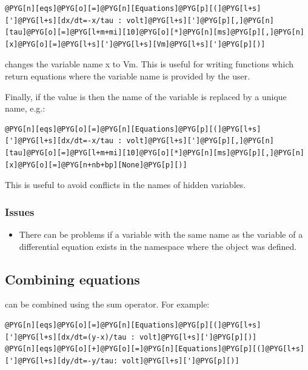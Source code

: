 \documentclass[letterpaper,10pt,english]{manual}
\begin{document}
\begin{Verbatim}[commandchars=@\[\]]
@PYG[n][eqs]@PYG[o][=]@PYG[n][Equations]@PYG[p][(]@PYG[l+s][']@PYG[l+s][dx/dt=-x/tau : volt]@PYG[l+s][']@PYG[p][,]@PYG[n][tau]@PYG[o][=]@PYG[l+m+mi][10]@PYG[o][*]@PYG[n][ms]@PYG[p][,]@PYG[n][x]@PYG[o][=]@PYG[l+s][']@PYG[l+s][Vm]@PYG[l+s][']@PYG[p][)]
\end{Verbatim}

changes the variable name x to Vm. This is useful for writing functions which return
equations where the variable name is provided by the user.

Finally, if the value is  then the name of the variable is replaced by a unique
name, e.g.:

\begin{Verbatim}[commandchars=@\[\]]
@PYG[n][eqs]@PYG[o][=]@PYG[n][Equations]@PYG[p][(]@PYG[l+s][']@PYG[l+s][dx/dt=-x/tau : volt]@PYG[l+s][']@PYG[p][,]@PYG[n][tau]@PYG[o][=]@PYG[l+m+mi][10]@PYG[o][*]@PYG[n][ms]@PYG[p][,]@PYG[n][x]@PYG[o][=]@PYG[n+nb+bp][None]@PYG[p][)]
\end{Verbatim}

This is useful to avoid conflicts in the names of hidden variables.


\subsubsection{Issues}
\begin{itemize}
\item {} 
There can be problems if a variable with the same name as the variable of a
differential equation exists in the namespace where the \hyperlink{brian.Equations}{} object was defined.

\end{itemize}

\subsection{Combining equations}

\hyperlink{brian.Equations}{} can be combined using the sum operator. For example:

\begin{Verbatim}[commandchars=@\[\]]
@PYG[n][eqs]@PYG[o][=]@PYG[n][Equations]@PYG[p][(]@PYG[l+s][']@PYG[l+s][dx/dt=(y-x)/tau : volt]@PYG[l+s][']@PYG[p][)]
@PYG[n][eqs]@PYG[o][+]@PYG[o][=]@PYG[n][Equations]@PYG[p][(]@PYG[l+s][']@PYG[l+s][dy/dt=-y/tau: volt]@PYG[l+s][']@PYG[p][)]
\end{Verbatim}
\end{document}

